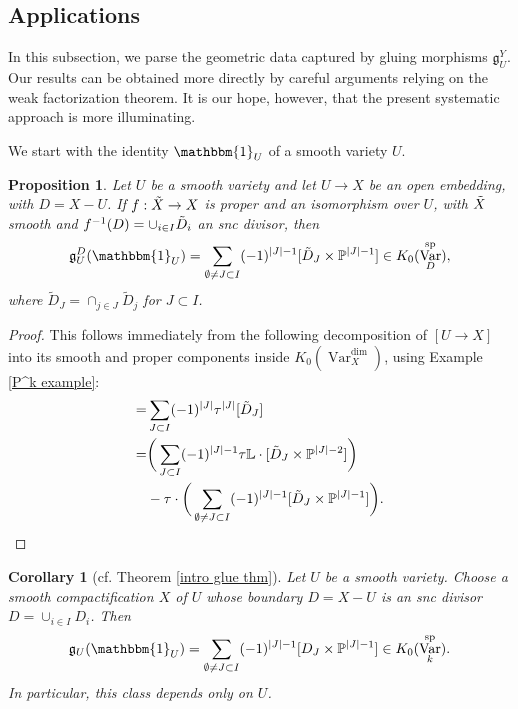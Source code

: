 \documentclass{amsart}
\newtheorem{cor}[thm]{Corollary}
\newtheorem{prop}[thm]{Proposition}
\theoremstyle{definition}
\DeclareMathOperator{\Var}{Var}
\DeclareMathOperator{\spr}{sp}
\newcommand{\Kspr}{K_0(\Var_k^{\spr})}
\numberwithin{equation}{section}
\begin{document}
\subsection{Applications}\label{subsection applications}

In this subsection, we parse the geometric data captured by gluing morphisms $\mathfrak{g}_U^Y$. Our results can be obtained more directly by careful arguments relying on the weak factorization theorem. It is our hope, however, that the present systematic approach is more illuminating.

We start with the identity $\mathbbm{1}_U$ of a smooth variety $U$.

\begin{prop}\label{genl gluing application}
Let $U$ be a smooth variety and let $U \rightarrow X$ be an open embedding, with $D = X - U$. If $f: \Tilde{X} \rightarrow X$ is proper and an isomorphism over $U$, with $\Tilde{X}$ smooth and $f^{-1}(D) = \cup_{i \in I} \Tilde{D}_i$ an snc divisor, then
\begin{align*}
    \mathfrak{g}_U^D(\mathbbm{1}_U) = \sum_{\emptyset \neq J \subset I} (-1)^{|J|-1} [\Tilde{D}_J \times \mathbb{P}^{|J|-1}] \in K_0(\Var_D^{\spr}),
\end{align*}
where $\tilde{D}_J = \cap_{j \in J} \tilde{D}_j$ for $J \subset I$.
\end{prop}

\begin{proof}
This follows immediately from the following decomposition of $[U \rightarrow X]$ into its smooth and proper components inside $K_0(\Var_X^{\dim})$, using Example \ref{P^k example}:
\begin{align*}
    [U \rightarrow X] =& \sum_{J \subset I} (-1)^{|J|} \tau^{|J|} [\Tilde{D}_J] \\
    =& \bigg( \sum_{J \subset I} (-1)^{|J|-1} \tau \mathbb{L} \cdot [\Tilde{D}_J \times \mathbb{P}^{|J|-2}] \bigg) \\ &- \tau \cdot \bigg( \sum_{\emptyset \neq J \subset I} (-1)^{|J|-1} [\Tilde{D}_J \times \mathbb{P}^{|J|-1}] \bigg).
\end{align*}
\end{proof}


\begin{cor}[cf. Theorem \ref{intro glue thm}]\label{paper glue thm}
Let $U$ be a smooth variety. Choose a smooth compactification $X$ of $U$ whose boundary $D = X - U$ is an snc divisor $D = \cup_{i \in I} D_i$. Then
\begin{align*}
    \mathfrak{g}_U(\mathbbm{1}_U) = \sum_{\emptyset \neq J \subset I} (-1)^{|J|-1} [D_J \times \mathbb{P}^{|J|-1}] \in \Kspr.
\end{align*}
In particular, this class depends only on $U$.
\end{cor}
\end{document}
